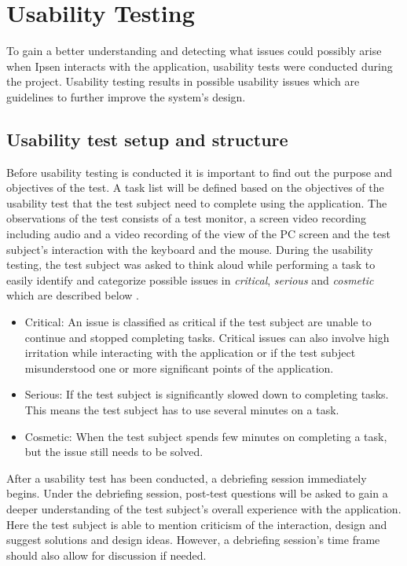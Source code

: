 \documentclass[../../master.tex]{subfiles}
\begin{document}
\section{Usability Testing} \label{sec:usabilitytesting}

To gain a better understanding and detecting what issues could possibly arise when Ipsen interacts with the application, usability tests were conducted during the project.
Usability testing results in possible usability issues which are guidelines to further improve the system's design.

\subsection{Usability test setup and structure}
Before usability testing is conducted it is important to find out the purpose and objectives of the test.
A task list will be defined based on the objectives of the usability test that the test subject need to complete using the application.
The observations of the test consists of a test monitor, a screen video recording including audio and a video recording of the view of the PC screen and the test subject's interaction with the keyboard and the mouse.
During the usability testing, the test subject was asked to think aloud while performing a task to easily identify and categorize possible issues in \textit{critical}, \textit{serious} and \textit{cosmetic} which are described below \cite{brugervenligtwebdesign}.

\begin{itemize}
  	\item
  	Critical: An issue is classified as critical if the test subject are unable to continue and stopped completing tasks.
	Critical issues can also involve high irritation while interacting with the application or if the test subject misunderstood one or more significant points of the application.
  	\item
  	Serious: If the test subject is significantly slowed down to completing tasks.
	This means the test subject has to use several minutes on a task.
	\item
	Cosmetic: When the test subject spends few minutes on completing a task, but the issue still needs to be solved.
\end{itemize}

After a usability test has been conducted, a debriefing session immediately begins.
Under the debriefing session, post-test questions will be asked to gain a deeper understanding of the test subject's overall experience with the application.
Here the test subject is able to mention criticism of the interaction, design and suggest solutions and design ideas.
However, a debriefing session's time frame should also allow for discussion if needed.
\end{document}
